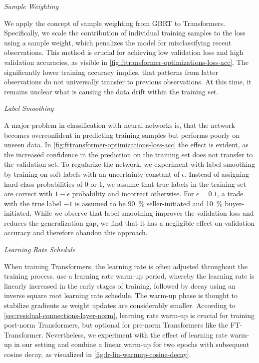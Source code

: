\emph{Sample Weighting}

We apply the concept of sample weighting from \gls{GBRT} to Transformers. Specifically, we scale the contribution of individual training samples to the loss using a sample weight, which penalizes the model for misclassifying recent observations. This method is crucial for achieving low validation loss and high validation accuracies, as visible in \cref{fig:fttransformer-optimizations-loss-acc}. The significantly lower training accuracy implies, that patterns from latter observations do not universally transfer to previous observations. At this time, it remains unclear what is causing the data drift within the training set.

\clearpage

\emph{Label Smoothing}

A major problem in classification with neural networks is, that the network becomes overconfident in predicting training samples but performs poorly on unseen data. In \cref{fig:fttransformer-optimizations-loss-acc} the effect is evident, as the increased confidence in the prediction on the training set does not transfer to the validation set. To regularize the network, we experiment with label smoothing \autocite[][2823]{szegedyRethinkingInceptionArchitecture2016} by training on soft labels with an uncertainty constant of $\epsilon$. Instead of assigning hard class probabilities of 0 or 1, we assume that true labels in the training set are correct with $1-\epsilon$ probability and incorrect otherwise. For $\epsilon=\num{0.1}$, a trade with the true label $-1$ is assumed to be \SI{90}{\percent} seller-initiated and \SI{10}{\percent} buyer-initiated. While we observe that label smoothing improves the validation loss and reduces the generalization gap, we find that it has a negligible effect on validation accuracy and therefore abandon this approach.

\emph{Learning Rate Schedule}

When training Transformers, the learning rate is often adjusted throughout the training process. \textcite[][7]{vaswaniAttentionAllYou2017} use a learning rate warm-up period, whereby the learning rate is linearly increased in the early stages of training, followed by decay using an inverse square root learning rate schedule. The warm-up phase is thought to stabilize gradients as weight updates are considerably smaller. According to \cref{sec:residual-connections-layer-norm}, learning rate warm-up is crucial for training post-norm Transformers, but optional for pre-norm Transformers like the FT-Transformer. Nevertheless, we experiment with the effect of learning rate warm-up in our setting and combine a linear warm-up for two epochs with subsequent cosine decay, as visualized in \cref{fig:lr-lin-warmup-cosine-decay}.

